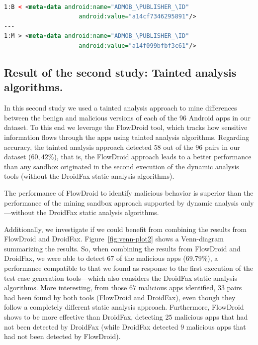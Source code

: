 \begin{lstlisting}[caption={Diff in the file \texttt{com.andoop.flyracing}
      AndroidManifest file of the malicious version.
      \texttt{B} stands for
      the benign version, while \texttt{M} stands for the malign version.}, language=XML,
    basicstyle=\fontsize{8}{6}\selectfont\ttfamily,label={lst:app65b}]

1:B < <meta-data android:name="ADMOB_\PUBLISHER_\ID"
                     android:value="a14cf7346295891"/>
---
1:M > <meta-data android:name="ADMOB_\PUBLISHER_\ID"
                     android:value="a14f099bfbf3c61"/>
\end{lstlisting}


\subsection{Result of the second study: Tainted analysis algorithms.}\label{sec:res-ss}

In this second study we used a tainted analysis approach to mine differences between the benign and malicious versions of each of the 96 Android apps in our dataset. To this end we leverage the FlowDroid tool, which tracks how sensitive information flows through the apps using tainted analysis algorithms. Regarding accuracy, the tainted analysis approach detected $58$ out of the $96$ pairs in our dataset ($60,42$\%), that is, the FlowDroid approach leads to a better performance than any sandbox originated in the second execution of the dynamic analysis tools (without the DroidFax static analysis algorithms).

\begin{finding}
  The performance of FlowDroid to identify malicious behavior
  is superior than the performance of the
  mining sandbox approach supported by dynamic analysis only---without
  the DroidFax static analysis algorithms.
\end{finding}

Additionally, we investigate if we could benefit from combining
the results from FlowDroid and DroidFax. Figure~\ref{fig:venn-plot2} shows a
Venn-diagram summarizing the results. So, when combining
the results from FlowDroid and DroidFax, we were able to detect
$67$ of the malicious apps ($69.79$\%), a performance compatible
to that we found as response to the first execution of the
test case generation tools---which also considers the DroidFax
static analysis algorithms. More interesting, from those $67$
malicious apps identified, $33$ pairs had been found by
both tools (FlowDroid and DroidFax), even though they follow
a completely different static analysis approach. Furthermore,
FlowDroid shows to be more effective than DroidFax, detecting $25$ malicious
apps that had not been detected by DroidFax (while DroidFax detected $9$
malicious apps that had not been detected by FlowDroid).

